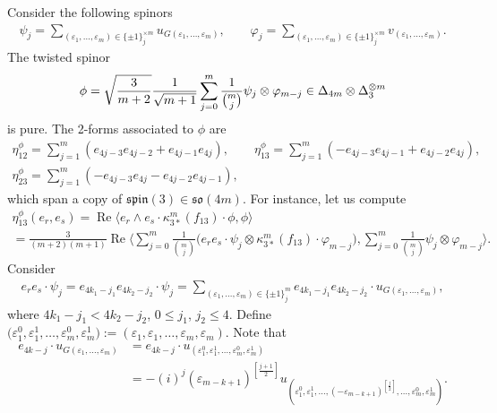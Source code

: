 \documentclass[pdftex]{sigma}
\numberwithin{equation}{section}
\begin{document}
Consider the following spinors
\begin{gather*}
\psi_j = \sum_{(\varepsilon_1,\dots,\varepsilon_m)\in\{\pm1\}_j^{\times m}} u_{G(\varepsilon_1,\dots,\varepsilon_m)}, \qquad
\varphi_j =\sum_{(\varepsilon_1,\dots,\varepsilon_m)\in\{\pm1\}_j^{\times m}}v_{(\varepsilon_1,\dots,\varepsilon_m)}.
\end{gather*}
The twisted spinor
\begin{gather}
\phi=\sqrt{3\over m+2}{1\over \sqrt{m+1}}\sum_{j=0}^m {1\over {m\choose j}} \psi_j\otimes\varphi_{m-j} \in \Delta_{4m}\otimes\Delta_3^{\otimes m} \label{eq: rank 3 pure spinor}
\end{gather}
is pure. The 2-forms associated to $\phi$ are
\begin{gather*}
 \eta_{12}^\phi = \sum_{j=1}^{m} (e_{4j-3}e_{4j-2}+e_{4j-1}e_{4j}),\qquad
 \eta_{13}^\phi = \sum_{j=1}^{m} (-e_{4j-3}e_{4j-1}+e_{4j-2}e_{4j}),\\
 \eta_{23}^\phi = \sum_{j=1}^{m} (-e_{4j-3}e_{4j}-e_{4j-2}e_{4j-1}),
\end{gather*}
which span a copy of $\mathfrak{spin}(3)\in \mathfrak{so}(4m)$. For instance, let us compute
\begin{gather*}
\eta_{13}^{\phi}(e_r,e_s) = \operatorname{Re}\big\langle e_r \wedge e_s \cdot \kappa_{3\ast}^{m}(f_{13})\cdot
\phi,\phi\big\rangle \\
{} = \frac{3}{(m+2)(m+1)}\operatorname{Re}\bigg \langle \sum_{j=0}^{m}\frac{1}{{m\choose j}}
\big(e_re_s\cdot\psi_{j}\otimes\kappa_{3\ast}^{m}(f_{13})\cdot\varphi_{m-j}\big), \sum_{j=0}^{m}\frac{1}{{m\choose
j}}\psi_{j}\otimes\varphi_{m-j}\bigg\rangle .
\end{gather*}
Consider
\begin{gather*}
e_re_s\cdot\psi_{j} = e_{4k_1-j_1}e_{4k_2-j_2}\cdot\psi_{j}= \sum_{(\varepsilon_{1},\dots, \varepsilon_{m})\in\{\pm
1\}_{j}^{m}}e_{4k_1-j_1}e_{4k_2-j_2}\cdot u_{G(\varepsilon_1,\dots,\varepsilon_m)},
\end{gather*}
where $4k_1-j_1< 4k_2-j_2$, $0\leq j_1$, $j_2\leq 4$. Define $\big(\varepsilon_1^{0},\varepsilon_1^{1},\dots,
\varepsilon_m^{0},\varepsilon_m^{1} \big):=(\varepsilon_{1},\varepsilon_1 ,\dots, \varepsilon_{m},\varepsilon_m )$. Note that
\begin{align*}
e_{4k-j}\cdot u_{G(\varepsilon_{1},\dots,\varepsilon_m)} &= e_{4k-j}\cdot u_{(\varepsilon_{1}^0,\varepsilon_{1}^{1},\dots,\varepsilon_{m}^{0},\varepsilon_{m}^{1})}\\
&= -(i)^j(\varepsilon_{m-k+1})^{[\frac{j+1}{2}]} u_{(\varepsilon_{1}^0,\varepsilon_{1}^1,\dots,(-\varepsilon_{m-k+1})^{[\frac{j}{2}]},\dots,\varepsilon_{m}^0, \varepsilon_{m}^1)}.
\end{align*}
\end{document}
